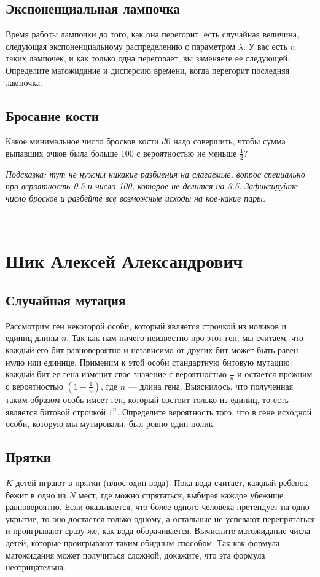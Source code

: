 \documentclass[12pt]{article}
\begin{document}
\subsection{Экспоненциальная лампочка}
Время работы лампочки до того, как она перегорит, есть случайная величина, следующая экспоненциальному распределению с параметром $\lambda$. У вас есть $n$ таких лампочек, и как только одна перегорает, вы заменяете ее следующей. Определите матожидание и дисперсию времени, когда перегорит последняя лампочка.

\subsection{Бросание кости}
Какое минимальное число бросков кости $d6$ надо совершить, чтобы сумма выпавших очков была больше 100 с вероятностью не меньше $\frac{1}{2}$? 

\emph{Подсказка: тут не нужны никакие разбиения на слагаемые, вопрос специально про вероятность 0.5 и число 100, которое не делится на 3.5. Зафиксируйте число бросков и разбейте все возможные исходы на кое-какие пары.}

\newpage
~
\newpage
\section{Шик Алексей Александрович}

\subsection{Случайная мутация}
Рассмотрим ген некоторой особи, который является строчкой из ноликов и единиц длины $n$. Так как нам ничего неизвестно про этот ген, мы считаем, что каждый его бит равновероятно и независимо от других бит может быть равен нулю или единице. Применим к этой особи стандартную битовую мутацию: каждый бит ее гена изменит свое значение с вероятностью $\frac{1}{n}$ и остается прежним с вероятностью $(1 - \frac{1}{n})$, где $n$ --- длина гена. Выяснилось, что полученная таким образом особь имеет ген, который состоит только из единиц, то есть является битовой строчкой $1^n$. Определите вероятность того, что в гене исходной особи, которую мы мутировали, был ровно один нолик.

\subsection{Прятки}
$K$ детей играют в прятки (плюс один вода). Пока вода считает, каждый ребенок бежит в одно из $N$ мест, где можно спрятаться, выбирая каждое убежище равновероятно. Если оказывается, что более одного человека претендует на одно укрытие, то оно достается только одному, а остальные не успевают перепрятаться и проигрывают сразу же, как вода оборачивается. Вычислите матожидание числа детей, которые проигрывают таким обидным способом. Так как формула матожидания может получиться сложной, докажите, что эта формула неотрицательна.
\end{document}
